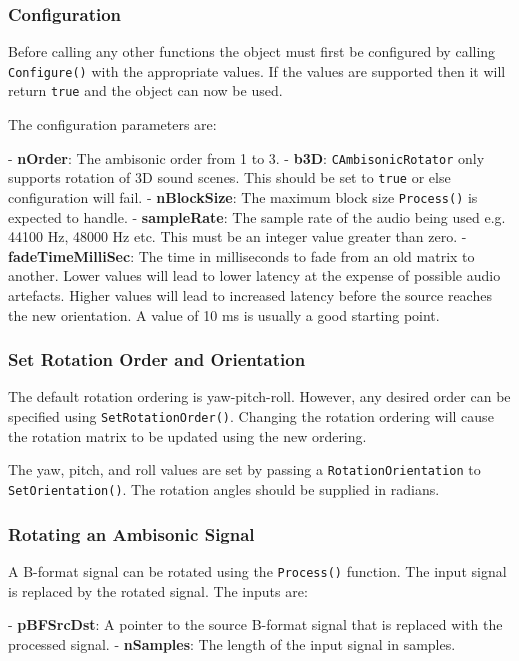 \documentclass[12pt]{report}
\newcommand{\code}[1]{\texttt{#1}}
\begin{document}
\subsubsection{Configuration}

Before calling any other functions the object must first be configured by calling \code{Configure()} with the appropriate values. If the values are supported then it will return \code{true} and the object can now be used.

The configuration parameters are:

- \textbf{nOrder}: The ambisonic order from 1 to 3.
- \textbf{b3D}: \code{CAmbisonicRotator} only supports rotation of 3D sound scenes. This should be set to \code{true} or else configuration will fail.
- \textbf{nBlockSize}: The maximum block size \code{Process()} is expected to handle.
- \textbf{sampleRate}: The sample rate of the audio being used e.g. 44100 Hz, 48000 Hz etc. This must be an integer value greater than zero.
- \textbf{fadeTimeMilliSec}: The time in milliseconds to fade from an old matrix to another. Lower values will lead to lower latency at the expense of possible audio artefacts. Higher values will lead to increased latency before the source reaches the new orientation. A value of 10 ms is usually a good starting point.

\subsubsection{Set Rotation Order and Orientation}

The default rotation ordering is yaw-pitch-roll. However, any desired order can be specified using \code{SetRotationOrder()}. Changing the rotation ordering will cause the rotation matrix to be updated using the new ordering.

The yaw, pitch, and roll values are set by passing a \code{RotationOrientation} to \code{SetOrientation()}. The rotation angles should be supplied in radians.

\subsubsection{Rotating an Ambisonic Signal}

A B-format signal can be rotated using the \code{Process()} function. The input signal is replaced by the rotated signal. The inputs are:

- \textbf{pBFSrcDst}: A pointer to the source B-format signal that is replaced with the processed signal.
- \textbf{nSamples}: The length of the input signal in samples.
\end{document}
